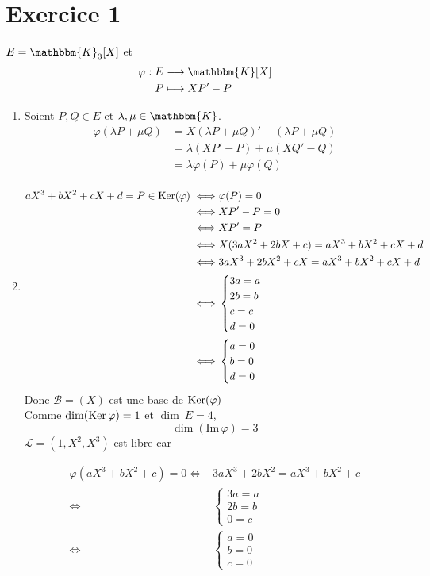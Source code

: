 \part{Exercice 1}

$E = \mathbbm{K}_3[X]$ et \begin{align*}
	\varphi: E &\longrightarrow \mathbbm{K}[X] \\
	P &\longmapsto XP' - P
\end{align*}

\begin{enumerate}
	\item Soient $P,Q \in E$ et $\lambda, \mu \in \mathbbm{K}$.
		\begin{align*}
			\varphi(\lambda P + \mu Q) &= X(\lambda P + \mu Q)' - (\lambda P + \mu Q) \\
			&= \lambda (XP' - P)  + \mu(XQ' - Q) \\
			&= \lambda \varphi(P) + \mu \varphi(Q) \\
		\end{align*}
	\item
		\begin{align*}
			aX^3 + bX^2 + cX + d = P \in \operatorname{Ker}(\varphi) \iff& \varphi(P) = 0\\
			\iff& XP' - P = 0\\
			\iff& XP' = P\\
			\iff& X(3aX^2 + 2bX + c) = aX^3 + bX^2+ cX + d\\
			\iff& 3aX^3 + 2bX^2 + cX = aX^3 + bX^2 + cX + d\\
			\iff& \begin{cases}
				3a = a\\
				2b = b\\
				c = c\\
				d = 0
			\end{cases}\\
			\iff& \begin{cases}
				a = 0\\
				b = 0\\
				d = 0
			\end{cases}
		\end{align*}
		Donc $\mathcal{B} = (X)$ est une base de $\operatorname{Ker}(\varphi)$ \\
		Comme $\dim(\operatorname{Ker} \varphi) = 1$ et $\dim\ E= 4$,  \[
			\dim(\mathrm{Im}\, \varphi) = 3
		\]
		$\mathcal{L} = (1, X^2, X^3)$ est libre car 
		
		\begin{align*}
			\varphi(aX^3 + bX^2 + c) = 0 \iff& 3aX^3 + 2bX^2 = aX^3 + bX^2 + c\\
			\iff&\begin{cases}
				3a = a\\
				2b = b\\
				0 = c
			\end{cases}\\
			\iff&\begin{cases}
				a = 0\\
				b = 0\\
				c = 0
			\end{cases}
		\end{align*}
\end{enumerate}

